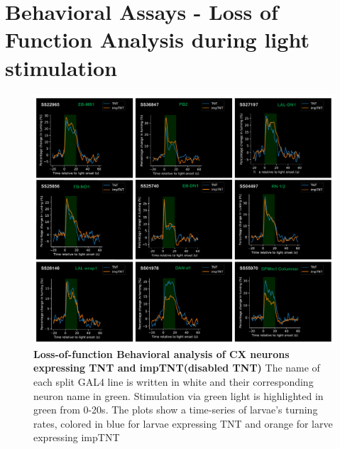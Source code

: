 
\section{Behavioral Assays - Loss of Function Analysis during light stimulation}
    \begin{figure}
        \centering
        \includegraphics[width=12cm]{Figs/CX/BehaviourAssays.pdf}
        \caption[Loss of Function Analysis during Light Stimulation]{\textbf{Loss-of-function Behavioral analysis of CX neurons expressing TNT and impTNT(disabled TNT)} The name of each split GAL4 line is written in white and their corresponding neuron name in green. Stimulation via green light is highlighted in green from 0-20s. The plots show a time-series of larvae's turning rates, colored in blue for larvae expressing TNT and orange for larve expressing impTNT}
        \label{LOS}
    \end{figure}

